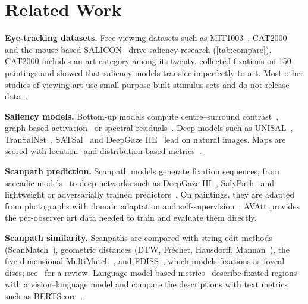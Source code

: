 \documentclass[10pt,twocolumn,letterpaper]{article}
\newcommand{\avatt}{AVAtt}
\newcommand{\mypara}[1]{\vspace{2pt}\noindent\textbf{#1}\hspace{0.5em}}
\begin{document}
\section{Related Work}
\label{sec:related}

\mypara{Eye-tracking datasets.} Free-viewing datasets such as MIT1003~\cite{judd2009mit},
CAT2000~\cite{borji2015cat2000} and the mouse-based SALICON~\cite{jiang2015salicon} drive saliency research
(\cref{tab:compare}). CAT2000 includes an art category among its twenty. \citet{lemeur2020paintings} collected
fixations on 150 paintings and showed that saliency models transfer imperfectly to art. Most other studies of viewing
art use small purpose-built stimulus sets and do not release data~\cite{nodine1993art,quiroga2011art,massaro2012art}.

\mypara{Saliency models.} Bottom-up models compute centre--surround contrast~\cite{itti1998model}, graph-based
activation~\cite{harel2006gbvs} or spectral residuals~\cite{hou2007spectral}. Deep models such as
UNISAL~\cite{droste2020unisal}, TranSalNet~\cite{lou2022transalnet}, SATSal~\cite{tliba2022satsal} and DeepGaze IIE~\cite{linardos2021deepgaze} lead
on natural images. Maps are scored with location- and distribution-based metrics~\cite{bylinskii2019metrics}.

\mypara{Scanpath prediction.} Scanpath models generate fixation sequences, from saccadic
models~\cite{lemeur2015saccadic} to deep networks such as DeepGaze III~\cite{kummerer2022deepgaze3},
SalyPath~\cite{kerkouri2021salypath,kerkouri2022salypath360} and lightweight or adversarially trained
predictors~\cite{kerkouri2022simple,kerkouri2023adversarial}. On paintings, they are adapted from photographs with
domain adaptation and self-supervision~\cite{kerkouri2022domain,tliba2022selfsupervised,kerkouri2026spgen}; \avatt{}
provides the per-observer art data needed to train and evaluate them directly.

\mypara{Scanpath similarity.} Scanpaths are compared with string-edit methods (ScanMatch~\cite{cristino2010scanmatch}),
geometric distances (DTW, Fr\'echet, Hausdorff, Mannan~\cite{mannan1995}), the five-dimensional
MultiMatch~\cite{dewhurst2012multimatch}, and FDISS~\cite{kerkouri2026fdiss}, which models fixations as foveal discs;
see~\cite{lemeur2013methods} for a review. Language-model-based metrics~\cite{kerkouri2026whatsaw,scanpathnlp} describe fixated regions with
a vision--language model and compare the descriptions with text metrics such as BERTScore~\cite{zhang2020bertscore}.
\end{document}
